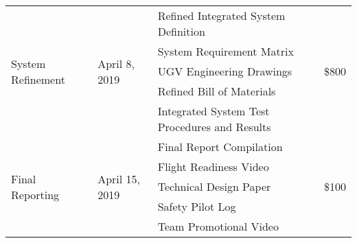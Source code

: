 \begin{center}
\begin{tabular}{|p{\colone}|p{\coltwo}|p{\colthree}|p{\colfour}|}
\multirow{5}{\colone}{System Refinement} & \multirow{5}{\coltwo}{April 8, 2019} & Refined Integrated System Definition & \multirow{5}{\colfour}{ \$800}\\
	&	& System Requirement Matrix&	\\
	&	& UGV Engineering Drawings&	\\
	&	& Refined Bill of Materials&	\\
	&	& Integrated System Test Procedures and Results &	\\ \hline

\multirow{5}{\colone}{Final Reporting} & \multirow{5}{\colone}{April 15, 2019} & Final Report Compilation& \multirow{5}{\colone}{\$100}\\
	&	& Flight Readiness Video&	\\
	&	&Technical Design Paper&	\\
	&	&Safety Pilot Log&	\\
	&	&Team Promotional Video& \\ \hline

  \hline
\end{tabular}

\end{center}
